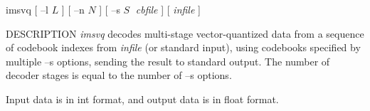 % 
% 
% 
% 
%                                                                        
%
\hypertarget{imsvq}{}

\begin{synopsis}
\item [imsvq] [ --l $L$ ] [ --n $N$ ] [ --s $S \;$ {\em cbfile} ] [ {\em infile} ]
\end{synopsis}

\begin{qsection}{DESCRIPTION}
{\em imsvq} decodes multi-stage vector-quantized data 
from a sequence of codebook indexes from {\em infile} (or standard input), 
using codebooks specified by multiple --s options, 
sending the result to standard output. 
The number of decoder stages is equal to the number of --s options.

Input data is in int format, and output data is in float format.
\end{qsection}

